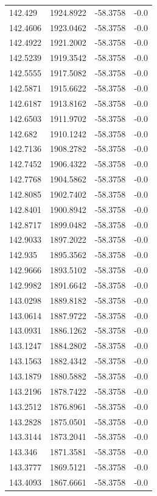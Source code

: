 \begin{table}[H]
\begin{tabular}{llll}
142.429 & 1924.8922 & -58.3758 & -0.0 \\
142.4606 & 1923.0462 & -58.3758 & -0.0 \\
142.4922 & 1921.2002 & -58.3758 & -0.0 \\
142.5239 & 1919.3542 & -58.3758 & -0.0 \\
142.5555 & 1917.5082 & -58.3758 & -0.0 \\
142.5871 & 1915.6622 & -58.3758 & -0.0 \\
142.6187 & 1913.8162 & -58.3758 & -0.0 \\
142.6503 & 1911.9702 & -58.3758 & -0.0 \\
142.682 & 1910.1242 & -58.3758 & -0.0 \\
142.7136 & 1908.2782 & -58.3758 & -0.0 \\
142.7452 & 1906.4322 & -58.3758 & -0.0 \\
142.7768 & 1904.5862 & -58.3758 & -0.0 \\
142.8085 & 1902.7402 & -58.3758 & -0.0 \\
142.8401 & 1900.8942 & -58.3758 & -0.0 \\
142.8717 & 1899.0482 & -58.3758 & -0.0 \\
142.9033 & 1897.2022 & -58.3758 & -0.0 \\
142.935 & 1895.3562 & -58.3758 & -0.0 \\
142.9666 & 1893.5102 & -58.3758 & -0.0 \\
142.9982 & 1891.6642 & -58.3758 & -0.0 \\
143.0298 & 1889.8182 & -58.3758 & -0.0 \\
143.0614 & 1887.9722 & -58.3758 & -0.0 \\
143.0931 & 1886.1262 & -58.3758 & -0.0 \\
143.1247 & 1884.2802 & -58.3758 & -0.0 \\
143.1563 & 1882.4342 & -58.3758 & -0.0 \\
143.1879 & 1880.5882 & -58.3758 & -0.0 \\
143.2196 & 1878.7422 & -58.3758 & -0.0 \\
143.2512 & 1876.8961 & -58.3758 & -0.0 \\
143.2828 & 1875.0501 & -58.3758 & -0.0 \\
143.3144 & 1873.2041 & -58.3758 & -0.0 \\
143.346 & 1871.3581 & -58.3758 & -0.0 \\
143.3777 & 1869.5121 & -58.3758 & -0.0 \\
143.4093 & 1867.6661 & -58.3758 & -0.0 \\

\end{tabular}
\end{table}
